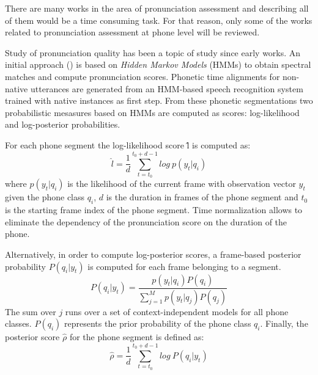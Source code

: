There are many works in the area of pronunciation assessment and describing all of them would
be a time consuming task. For that reason, only some of the works related to 
pronunciation assessment at phone level will be reviewed.

Study of pronunciation quality has been a topic of study since early works. An initial approach
(\cite{pronunciation_scoring_instruction}\cite{pronunciation_scoring_phone_segments_instruction}) 
is based on \textit{Hidden Markov Models} (HMMs) to obtain 
spectral matches and compute pronunciation scores. Phonetic time alignments for
non-native utterances are generated from an HMM-based speech recognition system trained
with native instances as first step. From these phonetic segmentations two 
probabilistic mesasures based on HMMs are computed as scores: log-likelihood and 
log-posterior probabilities.

For each phone segment the log-likelihood score \^{l} is computed as:
\begin{equation}
\hat{l} = \frac{1}{d} \sum_{t=t_{0}}^{t_{0}+d-1} log \ p(y_{t}|q_{i})
\end{equation}
where $p(y_{t}|q_{i})$ is the likelihood of the current frame with observation vector $y_{t}$
given the phone class $q_{i}$, $d$ is the duration in frames of the phone segment 
and $t_{0}$ is the starting frame index of the phone segment. Time normalization allows to 
eliminate the dependency of the pronunciation score on the duration of the phone.

Alternatively, in order to compute log-posterior scores, a frame-based posterior probability
$P(q_{i}|y_{t})$ is computed for each frame belonging to a segment.
\begin{equation}
P(q_{i}|y_{t}) = \frac{p(y_{t}|q_{i})P(q_{i})}{\sum\limits_{j=1}^{M} p(y_{t}|q_{j})P(q_{j})}
\end{equation}
The sum over $j$ runs over a set of context-independent models for all phone classes. $P(q_{i})$
represents the prior probability of the phone class $q_{i}$. Finally, the posterior score $\hat{\rho}$ for the phone segment is defined as:
\begin{equation}
\hat{\rho} = \frac{1}{d}\sum_{t=t_{0}}^{t_{0}+d-1} log \ P(q_{i}|y_{t})
\end{equation}

